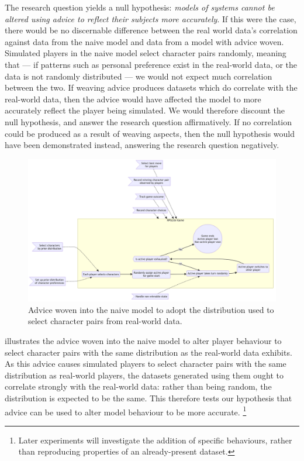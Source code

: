 The research question yields a null hypothesis: \emph{models of systems cannot
be altered using advice to reflect their subjects more accurately}. If this were
the case, there would be no discernable difference between the real world data's
correlation against data from the naive model and data from a model with advice
woven. Simulated players in the naive model select character pairs randomly,
meaning that --- if patterns such as personal preference exist in the real-world
data, or the data is not randomly distributed --- we would not expect much
correlation between the two. If weaving advice produces datasets which do
correlate with the real-world data, then the advice would have affected the
model to more accurately reflect the player being simulated. We would therefore
discount the null hypothesis, and answer the research question affirmatively. If
no correlation could be produced as a result of weaving aspects, then the null
hypothesis would have been demonstrated instead, answering the research question
negatively.

\begin{figure}[h]
  \centering
  \includegraphics[width=\columnwidth]{70_generality_of_aspects/diagrams/exp2_prior_distribution_model.png}
  \caption{Advice woven into the naive model to adopt the distribution used to select character pairs from real-world data.}
  \label{fig:exp2_prior_distribution_model}
\end{figure}

 illustrates the advice woven into the
naive model to alter player behaviour to select character pairs with the same
distribution as the real-world data exhibits. As this advice causes simulated
players to select character pairs with the same distribution as real-world
players, the datasets generated using them ought to correlate strongly with the
real-world data: rather than being random, the distribution is expected to be
the same. This therefore tests our hypothesis that advice can be used to alter
model behaviour to be more accurate.
\footnote{
  Later experiments will investigate the addition of specific behaviours, rather
  than reproducing properties of an already-present dataset.
}


